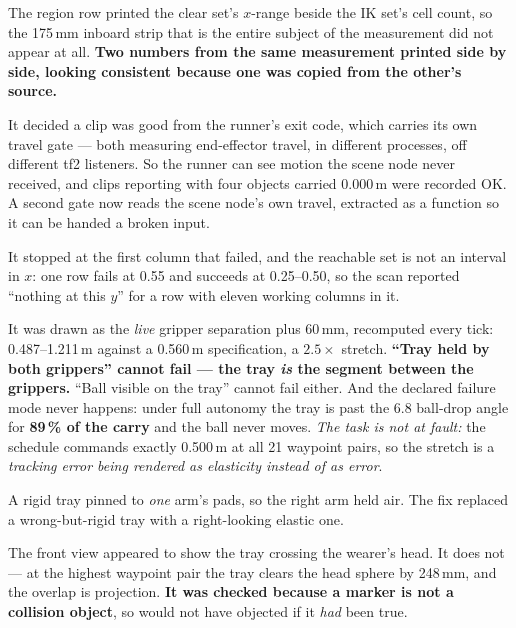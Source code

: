 {The region row printed the clear set's $x$-range beside the IK set's cell
count, so the 175\,mm inboard strip that is the entire subject of the
measurement did not appear at all. \textbf{Two numbers from the same measurement
printed side by side, looking consistent because one was copied from the
other's source.}}

{It decided a clip was good from the runner's exit code, which carries its own
travel gate --- both measuring end-effector travel, in different processes, off
different tf2 listeners. So the runner can see motion the scene node never
received, and clips reporting  with four objects
carried 0.000\,m were recorded OK. A second gate now reads the scene node's own
travel, extracted as a function so it can be handed a broken input.}

{It stopped at the first column that failed, and the reachable set is not an
interval in $x$: one row fails at 0.55 and succeeds at 0.25--0.50, so the scan
reported ``nothing at this $y$'' for a row with eleven working columns in it.}

{It was drawn as the \emph{live} gripper separation plus 60\,mm, recomputed
every tick: 0.487--1.211\,m against a 0.560\,m specification, a $2.5\times$
stretch. \textbf{``Tray held by both grippers'' cannot fail --- the tray
\emph{is} the segment between the grippers.} ``Ball visible on the tray'' cannot
fail either. And the declared failure mode never happens: under full autonomy
the tray is past the 6.8\dg{} ball-drop angle for \textbf{89\,\% of the carry}
and the ball never moves. \textit{The task is not at fault:} the schedule
commands exactly 0.500\,m at all 21 waypoint pairs, so the stretch is a
\emph{tracking error being rendered as elasticity instead of as error}.}

{A rigid tray pinned to \emph{one} arm's pads, so the right arm held air. The
fix replaced a wrong-but-rigid tray with a right-looking elastic one.}

{The front view appeared to show the tray crossing the wearer's head. It does
not --- at the highest waypoint pair the tray clears the head sphere by
248\,mm, and the overlap is projection. \textbf{It was checked because a marker
is not a collision object}, so  would not have objected
if it \emph{had} been true.}

